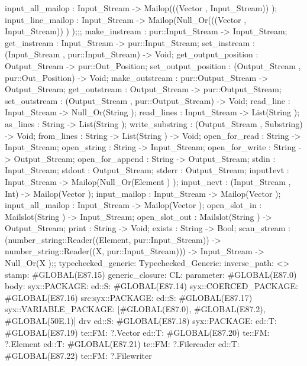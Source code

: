 {{                input_all_mailop : Input_Stream -> Mailop(((Vector , Input_Stream)) );
                input_line_mailop : Input_Stream -> Mailop(Null_Or(((Vector , Input_Stream)) ) );};;
    make_instream : pur::Input_Stream -> Input_Stream;
    get_instream : Input_Stream -> pur::Input_Stream;
    set_instream : (Input_Stream , pur::Input_Stream) -> Void;
    get_output_position : Output_Stream -> pur::Out_Position;
    set_output_position : (Output_Stream , pur::Out_Position) -> Void;
    make_outstream : pur::Output_Stream -> Output_Stream;
    get_outstream : Output_Stream -> pur::Output_Stream;
    set_outstream : (Output_Stream , pur::Output_Stream) -> Void;
    read_line : Input_Stream -> Null_Or(String );
    read_lines : Input_Stream -> List(String );
    as_lines : String -> List(String );
    write_substring : (Output_Stream , Substring) -> Void;
    from_lines : String -> List(String ) -> Void;
    open_for_read : String -> Input_Stream;
    open_string : String -> Input_Stream;
    open_for_write : String -> Output_Stream;
    open_for_append : String -> Output_Stream;
    stdin : Input_Stream;
    stdout : Output_Stream;
    stderr : Output_Stream;
    input1evt : Input_Stream -> Mailop(Null_Or(Element ) );
    input_nevt : (Input_Stream , Int) -> Mailop(Vector );
    input_mailop : Input_Stream -> Mailop(Vector );
    input_all_mailop : Input_Stream -> Mailop(Vector );
    open_slot_in : Mailslot(String ) -> Input_Stream;
    open_slot_out : Mailslot(String ) -> Output_Stream;
    print : String -> Void;
    exists : String -> Bool;
        scan_stream :
            (number_string::Reader((Element, pur::Input_Stream)) -> number_string::Reader((X, pur::Input_Stream)))
            ->
            Input_Stream -> Null_Or(X );};
typechecked_generic:
Typechecked_Generic:
inverse_path: <>
stamp: #GLOBAL(E87.15)
generic_closure:
CL:
parameter: #GLOBAL(E87.0)
body: syx::PACKAGE:
        ed::S: #GLOBAL(E87.14)
            syx::COERCED_PACKAGE:
                #GLOBAL(E87.16)
                 src:syx::PACKAGE:
                            ed::S: #GLOBAL(E87.17) syx::VARIABLE_PACKAGE: [#GLOBAL(E87.0), #GLOBAL(E87.2), #GLOBAL(50E.1)] drv
                                    ed::S: #GLOBAL(E87.18)
                                     syx::PACKAGE:
                                            ed::T: #GLOBAL(E87.19) te::FM: ?.Vector
                                            ed::T: #GLOBAL(E87.20) te::FM: ?.Element
                                            ed::T: #GLOBAL(E87.21) te::FM: ?.Filereader
                                            ed::T: #GLOBAL(E87.22) te::FM: ?.Filewriter
